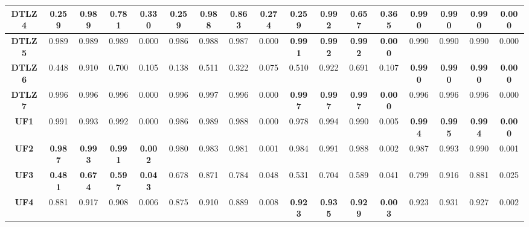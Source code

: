 \begin{table*}[t]
\begin{scriptsize}
\begin{tabular}{cc|c|c|c|c|c|c|c|c|c|c|c|c|c|c|c}
\multicolumn{1}{c|}{\textbf{DTLZ4}} & 0.259          & 0.989          & 0.781          & 0.330          & 0.259          & 0.988          & 0.863          & 0.274          & 0.259          & 0.992          & 0.657          & 0.365          & \textbf{0.990} & \textbf{0.990} & \textbf{0.990} & \textbf{0.000} \\ \hline
\multicolumn{1}{c|}{\textbf{DTLZ5}} & 0.989          & 0.989          & 0.989          & 0.000          & 0.986          & 0.988          & 0.987          & 0.000          & \textbf{0.991} & \textbf{0.992} & \textbf{0.992} & \textbf{0.000} & 0.990          & 0.990          & 0.990          & 0.000          \\ \hline
\multicolumn{1}{c|}{\textbf{DTLZ6}} & 0.448          & 0.910          & 0.700          & 0.105          & 0.138          & 0.511          & 0.322          & 0.075          & 0.510          & 0.922          & 0.691          & 0.107          & \textbf{0.990} & \textbf{0.990} & \textbf{0.990} & \textbf{0.000} \\ \hline
\multicolumn{1}{c|}{\textbf{DTLZ7}} & 0.996          & 0.996          & 0.996          & 0.000          & 0.996          & 0.997          & 0.996          & 0.000          & \textbf{0.997} & \textbf{0.997} & \textbf{0.997} & \textbf{0.000} & 0.996          & 0.996          & 0.996          & 0.000          \\ \hline
\multicolumn{1}{c|}{\textbf{UF1}}   & 0.991          & 0.993          & 0.992          & 0.000          & 0.986          & 0.989          & 0.988          & 0.000          & 0.978          & 0.994          & 0.990          & 0.005          & \textbf{0.994} & \textbf{0.995} & \textbf{0.994} & \textbf{0.000} \\ \hline
\multicolumn{1}{c|}{\textbf{UF2}}   & \textbf{0.987} & \textbf{0.993} & \textbf{0.991} & \textbf{0.002} & 0.980          & 0.983          & 0.981          & 0.001          & 0.984          & 0.991          & 0.988          & 0.002          & 0.987          & 0.993          & 0.990          & 0.001          \\ \hline
\multicolumn{1}{c|}{\textbf{UF3}}   & \textbf{0.481} & \textbf{0.674} & \textbf{0.597} & \textbf{0.043} & 0.678          & 0.871          & 0.784          & 0.048          & 0.531          & 0.704          & 0.589          & 0.041          & 0.799          & 0.916          & 0.881          & 0.025          \\ \hline
\multicolumn{1}{c|}{\textbf{UF4}}   & 0.881          & 0.917          & 0.908          & 0.006          & 0.875          & 0.910          & 0.889          & 0.008          & \textbf{0.923} & \textbf{0.935} & \textbf{0.929} & \textbf{0.003} & 0.923          & 0.931          & 0.927          & 0.002          \\ \hline

\end{tabular}
\end{scriptsize}
\end{table*}

